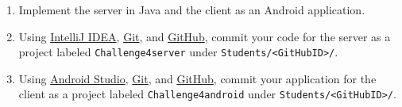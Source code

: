 \documentclass[11pt]{article}
\begin{document}
\begin{enumerate}
\item Implement the server in Java and the client as an Android application.
\item Using \href{https://www.jetbrains.com/idea/}{IntelliJ IDEA}, \href{http://git-scm.com/}{Git}, and \href{https://GitHub.com}{GitHub}, commit your code for the server as a project labeled \texttt{Challenge4server} under \texttt{Students/<GitHubID>/}.
\item Using \href{http://developer.android.com/sdk/index.html}{Android Studio}, \href{http://git-scm.com/}{Git}, and \href{https://GitHub.com}{GitHub}, commit your application for the client as a project labeled \texttt{Challenge4android} under \texttt{Students/<GitHubID>/}.
\end{enumerate}
\end{document}
